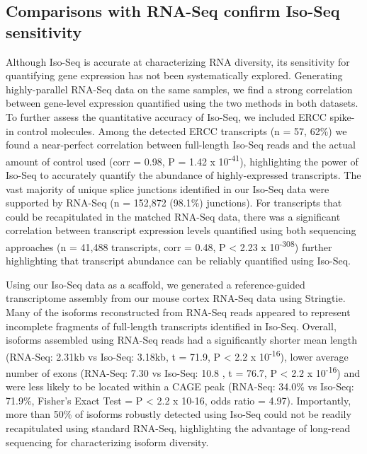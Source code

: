 \newpage
\subsection{Comparisons with RNA-Seq confirm Iso-Seq sensitivity} 
\label{sec: whole_isoseqvsrnaseq}
Although Iso-Seq is accurate at characterizing RNA diversity\cite{Wang2019}, its sensitivity for quantifying gene expression has not been systematically explored. Generating highly-parallel RNA-Seq data on the same samples, we find a strong correlation between gene-level expression quantified using the two methods in both datasets. To further assess the quantitative accuracy of Iso-Seq, we included ERCC spike-in control molecules. Among the detected ERCC transcripts (n = 57, 62\%) we found a near-perfect correlation between full-length Iso-Seq reads and the actual amount of control used (corr = 0.98, P = 1.42 x 10\textsuperscript{-41}), highlighting the power of Iso-Seq to accurately quantify the abundance of highly-expressed transcripts. The vast majority of unique splice junctions identified in our Iso-Seq data were supported by RNA-Seq (n = 152,872 (98.1\%) junctions). For transcripts that could be recapitulated in the matched RNA-Seq data, there was a significant correlation between transcript expression levels quantified using both sequencing approaches (n = 41,488 transcripts, corr = 0.48, P < 2.23 x 10\textsuperscript{-308}) further highlighting that transcript abundance can be reliably quantified using Iso-Seq. 

Using our Iso-Seq data as a scaffold, we generated a reference-guided transcriptome assembly from our mouse cortex RNA-Seq data using Stringtie\cite{Pertea2015}. Many of the isoforms reconstructed from RNA-Seq reads appeared to represent incomplete fragments of full-length transcripts identified in Iso-Seq. Overall, isoforms assembled using RNA-Seq reads had a significantly shorter mean length (RNA-Seq: 2.31kb vs Iso-Seq: 3.18kb, t = 71.9, P < 2.2 x 10\textsuperscript{-16}), lower average number of exons (RNA-Seq: 7.30 vs Iso-Seq: 10.8 , t = 76.7, P < 2.2 x 10\textsuperscript{-16}) and were less likely to be located within a CAGE peak (RNA-Seq: 34.0\% vs Iso-Seq: 71.9\%, Fisher’s Exact Test = P < 2.2 x 10-16, odds ratio = 4.97). Importantly, more than 50\% of isoforms robustly detected using Iso-Seq could not be readily recapitulated using standard RNA-Seq, highlighting the advantage of long-read sequencing for characterizing isoform diversity.%

